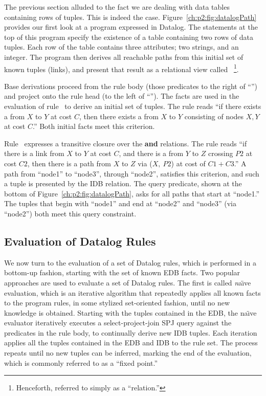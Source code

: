 The previous section alluded to the fact we are dealing with data tables
containing rows of tuples.  This is indeed the case.
Figure~\ref{ch:p2:fig:datalogPath} provides our first look at a program
expressed in Datalog.  The statements at the top of this program specify the
existence of a  table containing two rows of data tuples.  Each row of
the  table contains three attributes; two strings, and an integer.
The program then derives all reachable paths from this initial set of known
tuples (links), and present that result as a relational view called 
~\footnote{Henceforth, referred to simply as a ``relation.''}.

Base derivations proceed from the rule body (those predicates to the right of
``\ol{:-}'') and project onto the rule head (to the left of ``\ol{:-}'').  The
 facts are used in the evaluation of rule~ to derive an initial
set of  tuples.  The rule reads ``if there exists a  from $X$
to $Y$ at cost $C$, then there exists a  from $X$ to $Y$ consisting of
nodes $X, Y$ at cost $C$.'' Both initial facts meet this criterion.

Rule~ expresses a transitive closure over the  {\bf and}
 relations.  The rule reads ``if there is a link from $X$ to $Y$ at
cost $C$, and there is a  from $Y$ to $Z$ crossing $P2$ at cost $C2$,
then there is a path from $X$ to $Z$ via ($X,\ P2$) at cost of $C1+C3$.'' A
path from ``node1'' to ``node3'', through ``node2'', satisfies this criterion,
and such a tuple is presented by the  IDB relation.  The query
predicate, shown at the bottom of Figure~\ref{ch:p2:fig:datalogPath}, asks for
all paths that start at ``node1.'' The  tuples that begin
with ``node1'' and end at ``node2'' and ``node3'' (via ``node2'') both meet
this query constraint.

\subsection{Evaluation of Datalog Rules}

We now turn to the evaluation of a set of Datalog rules, which is performed in
a bottom-up fashion, starting with the set of known EDB facts.  Two popular
approaches are used to evaluate a set of Datalog rules.  The first is called
{\emph na\"{\i}ve evaluation}, which is an iterative algorithm that repeatedly
applies all known facts to the program rules, in some stylized set-oriented
fashion, until no new knowledge is obtained.  Starting with the tuples
contained in the EDB, the na\"{\i}ve evaluator iteratively executes a
select-project-join SPJ query against the predicates in the rule body, to
continually derive new IDB tuples.  Each iteration applies all the tuples
contained in the EDB and IDB to the rule set.  The process repeats until no new
tuples can be inferred, marking the end of the evaluation, which is commonly
referred to as a ``fixed point.''

